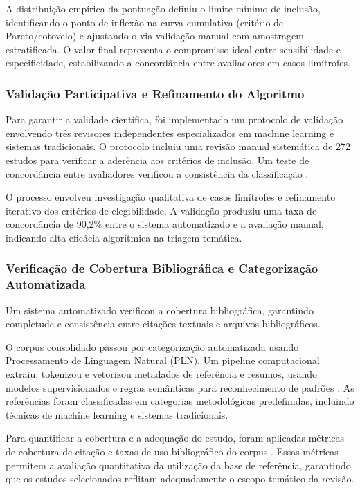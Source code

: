 A distribuição empírica da pontuação definiu o limite mínimo de inclusão, identificando o ponto de inflexão na curva cumulativa (critério de Pareto/cotovelo) e ajustando-o via validação manual com amostragem estratificada. O valor final representa o compromisso ideal entre sensibilidade e especificidade, estabilizando a concordância entre avaliadores em casos limítrofes.

\subsubsection{Validação Participativa e Refinamento do Algoritmo}

Para garantir a validade científica, foi implementado um protocolo de validação envolvendo três revisores independentes especializados em machine learning e sistemas tradicionais. O protocolo incluiu uma revisão manual sistemática de 272 estudos para verificar a aderência aos critérios de inclusão. Um teste de concordância entre avaliadores verificou a consistência da classificação  \cite{Tricco2018}.

O processo envolveu investigação qualitativa de casos limítrofes e refinamento iterativo dos critérios de elegibilidade. A validação produziu uma taxa de concordância de 90,2\% entre o sistema automatizado e a avaliação manual, indicando alta eficácia algorítmica na triagem temática.

\subsubsection{Verificação de Cobertura Bibliográfica e Categorização Automatizada}

Um sistema automatizado verificou a cobertura bibliográfica, garantindo completude e consistência entre citações textuais e arquivos bibliográficos.

O corpus consolidado passou por categorização automatizada usando Processamento de Linguagem Natural (PLN). Um pipeline computacional extraiu, tokenizou e vetorizou metadados de referência e resumos, usando modelos supervisionados e regras semânticas para reconhecimento de padrões  \cite{Young2019,Casey2021}. As referências foram classificadas em categorias metodológicas predefinidas, incluindo técnicas de machine learning e sistemas tradicionais.

Para quantificar a cobertura e a adequação do estudo, foram aplicadas métricas de cobertura de citação e taxas de uso bibliográfico do corpus  \cite{webster2002,tranfield2003}. Essas métricas permitem a avaliação quantitativa da utilização da base de referência, garantindo que os estudos selecionados reflitam adequadamente o escopo temático da revisão.

